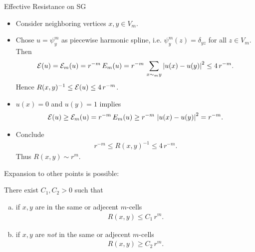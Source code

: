 \begin{frame}[allowframebreaks]{Effective Resistance on SG}


    \begin{itemize}
        \item Consider neighboring vertices $x,y \in V_{m}$.

        \item Chose $u=\psi^{m}_{y}$ as piecewise harmonic spline, i.e. $\psi^{m}_{y}(z) = \delta_{yz}$ for all $z\in V_{m}$. Then
        \begin{align*}
            \mathcal{E}(u) = \mathcal{E}_{m}(u) = r^{-m}\, E_{m}(u) = r^{-m}\, \sum_{x\sim_m y} \left\vert u(x) - u(y) \right\vert^{2} \leq 4\,r^{-m}.
        \end{align*}
        Hence $R(x,y)^{-1} \leq \mathcal{E}(u) \leq 4\,r^{-m}$.
        
        \item $u(x)=0$ and $u(y)=1$ implies
        \begin{align*}
        \mathcal{E}(u) \geq \mathcal{E}_{m}(u) = r^{-m}\, E_{m}(u) \geq r^{-m}\, \left\vert u(x) - u(y) \right\vert^{2} = r^{-m}.
        \end{align*}
        \item Conclude
        \begin{align*}
            r^{-m}\leq R(x,y)^{-1} \leq 4\, r^{-m}.
        \end{align*}
        Thus $R(x,y) \sim r^{m}$.
    \end{itemize}
    \newpage
    
    Expansion to other points is possible:
    \begin{theorem}
        There exist $C_{1}, C_{2} > 0$ such that
        \begin{enumerate}[(a)]
            \item if $x,y$ are in the same or adjecent $m$-cells
            \begin{align*}
                R(x,y) \leq C_{1}\,r^{m}.
            \end{align*}
            \item if $x,y$ are \emph{not} in the same or adjecent $m$-cells
            \begin{align*}
                R(x,y) \geq C_{2}\,r^{m}.
            \end{align*}
        \end{enumerate}
    \end{theorem}
    \newpage


\end{frame}
